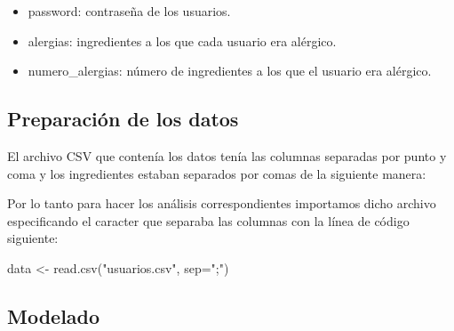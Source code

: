 \documentclass[
]{article}
\newenvironment{Shaded}{\begin{snugshade}}{\end{snugshade}}
\newcommand{\AttributeTok}[1]{\textcolor[rgb]{0.77,0.63,0.00}{#1}}
\newcommand{\FunctionTok}[1]{\textcolor[rgb]{0.00,0.00,0.00}{#1}}
\newcommand{\NormalTok}[1]{#1}
\newcommand{\OtherTok}[1]{\textcolor[rgb]{0.56,0.35,0.01}{#1}}
\newcommand{\StringTok}[1]{\textcolor[rgb]{0.31,0.60,0.02}{#1}}
\providecommand{\tightlist}{%
  \setlength{\itemsep}{0pt}\setlength{\parskip}{0pt}}
\begin{document}
\begin{itemize}
\tightlist
\item
  password: contraseña de los usuarios.
\end{itemize}

\begin{itemize}
\tightlist
\item
  alergias: ingredientes a los que cada usuario era alérgico.
\end{itemize}

\begin{itemize}
\tightlist
\item
  numero\_alergias: número de ingredientes a los que el usuario era
  alérgico.
\end{itemize}

\hypertarget{preparaciuxf3n-de-los-datos}{%
\subsection{Preparación de los
datos}\label{preparaciuxf3n-de-los-datos}}

El archivo CSV que contenía los datos tenía las columnas separadas por
punto y coma y los ingredientes estaban separados por comas de la
siguiente manera:

\begin{Shaded}
\end{Shaded}

Por lo tanto para hacer los análisis correspondientes importamos dicho
archivo especificando el caracter que separaba las columnas con la línea
de código siguiente:

\begin{Shaded}
\begin{Highlighting}[]
\NormalTok{data }\OtherTok{\textless{}{-}} \FunctionTok{read.csv}\NormalTok{(}\StringTok{"usuarios.csv"}\NormalTok{, }\AttributeTok{sep=}\StringTok{";"}\NormalTok{)}
\end{Highlighting}
\end{Shaded}

\hypertarget{modelado}{%
\subsection{Modelado}\label{modelado}}
\end{document}
